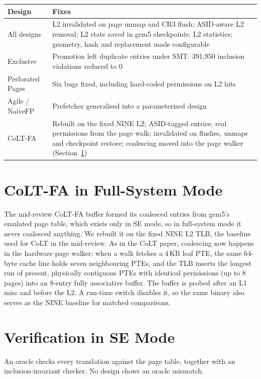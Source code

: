\documentclass[11pt]{article}
\begin{document}
\begin{table}[H]
\centering
\begin{tabularx}{\textwidth}{@{}l L@{}}
\toprule
\textbf{Design} & \textbf{Fixes} \\
\midrule
All designs & L2 invalidated on page unmap and CR3 flush; ASID-aware L2 removal; L2 state saved in gem5 checkpoints; L2 statistics; geometry, hash and replacement made configurable \\
Exclusive & Promotion left duplicate entries under SMT: 391{,}950 inclusion violations reduced to 0 \\
Perforated Pages & Six bugs fixed, including hard-coded permissions on L2 hits \\
Agile / NaiveFP & Prefetcher generalised into a parameterised design \\
CoLT-FA & Rebuilt on the fixed NINE L2; ASID-tagged entries; real permissions from the page walk; invalidated on flushes, unmaps and checkpoint restore; coalescing moved into the page walker (Section~\ref{sec:colt}) \\
\bottomrule
\end{tabularx}
\end{table}

\section{CoLT-FA in Full-System Mode}
\label{sec:colt}
The mid-review CoLT-FA buffer formed its coalesced entries from gem5's emulated page table, which exists only in SE mode, so in full-system mode it never coalesced anything. We rebuilt it on the fixed NINE L2 TLB, the baseline used for CoLT in the mid-review. As in the CoLT paper, coalescing now happens in the hardware page walker: when a walk fetches a 4\,KB leaf PTE, the same 64-byte cache line holds seven neighbouring PTEs, and the TLB inserts the longest run of present, physically contiguous PTEs with identical permissions (up to 8 pages) into an 8-entry fully associative buffer. The buffer is probed after an L1 miss and before the L2. A run-time switch disables it, so the same binary also serves as the NINE baseline for matched comparisons.

\section{Verification in SE Mode}
An oracle checks every translation against the page table, together with an inclusion-invariant checker. No design shows an oracle mismatch.
\end{document}
